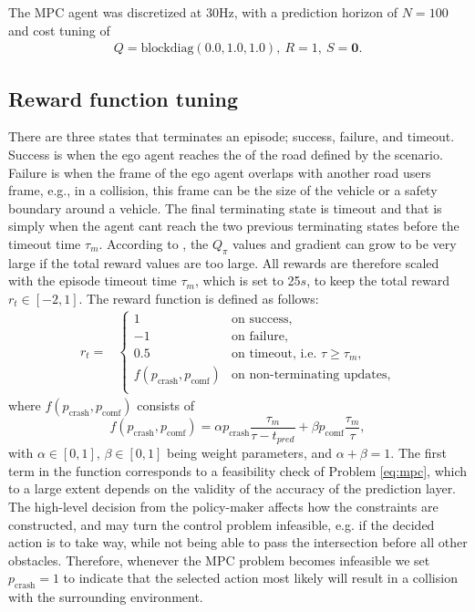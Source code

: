 The MPC agent was discretized at $30$Hz, with a prediction horizon of $N=100$ and cost tuning of
\begin{gather}
Q=\mathrm{blockdiag}(0.0,1.0,1.0),\ R=1,\ S=\mathbf{0}.
\end{gather}

\subsection{Reward function tuning}\label{sec:reward}
There are three states that terminates an episode; success, failure, and timeout. Success is when the ego agent reaches the of the road defined by the scenario. Failure is when the frame of the ego agent overlaps with another road users frame, e.g., in a collision, this frame can be the size of the vehicle or a safety boundary around a vehicle. The final terminating state is timeout and that is simply when the agent cant reach the two previous terminating states before the timeout time $ \tau_m$.
According to \cite{VanHasseltLearningMagnitude}, the $Q_\pi$ values and gradient can grow to be very large if the total reward values are too large. All rewards are therefore scaled with the episode timeout time $\tau_m$, which is set to 25$s$, to keep the total reward $r_t \in [-2, 1]$.
The reward function is defined as follows:
\begin{align*}
r_t = &\begin{cases}
1 & \text{on success, }\\
-1                & \text{on failure},\\
0.5                 & \text{on timeout, i.e. } \tau \ge \tau_m,\\
f(p_{\text{crash}}, p_{\text{comf}}) & \text{on non-terminating updates},\\
\end{cases} 
\end{align*}
where $f(p_{\text{crash}}, p_{\text{comf}})$ consists of
\begin{equation}
f(p_{\text{crash}}, p_{\text{comf}})  = \alpha p_{\text{crash}}  \frac{\tau_m}{\tau - t_{pred}} + \beta p_{\text{comf}} \frac{\tau_m}{\tau},
\label{eq:mpc_reward}
\end{equation}
with  $\alpha\in[0,1]$, $\beta\in[0,1]$ being weight parameters, and $\alpha+\beta=1$. The first term in the function corresponds to a feasibility check of Problem \eqref{eq:mpc}, which to a large extent depends on the validity of the accuracy of the prediction layer. The high-level decision from the policy-maker affects how the constraints are constructed, and may turn the control problem infeasible, e.g. if the decided action is to take way, while not being able to pass the intersection before all other obstacles. Therefore, whenever the MPC problem becomes infeasible we set $p_\mathrm{crash}=1$ to indicate that the selected action most likely will result in a collision with the surrounding environment.

